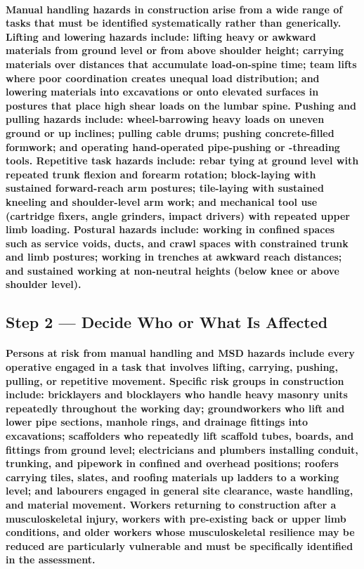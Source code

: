 \paragraph{Manual handling hazards in construction arise from a wide range of tasks that must be identified systematically rather than generically. Lifting and lowering hazards include: lifting heavy or awkward materials from ground level or from above shoulder height; carrying materials over distances that accumulate load-on-spine time; team lifts where poor coordination creates unequal load distribution; and lowering materials into excavations or onto elevated surfaces in postures that place high shear loads on the lumbar spine. Pushing and pulling hazards include: wheel-barrowing heavy loads on uneven ground or up inclines; pulling cable drums; pushing concrete-filled formwork; and operating hand-operated pipe-pushing or -threading tools. Repetitive task hazards include: rebar tying at ground level with repeated trunk flexion and forearm rotation; block-laying with sustained forward-reach arm postures; tile-laying with sustained kneeling and shoulder-level arm work; and mechanical tool use (cartridge fixers, angle grinders, impact drivers) with repeated upper limb loading. Postural hazards include: working in confined spaces such as service voids, ducts, and crawl spaces with constrained trunk and limb postures; working in trenches at awkward reach distances; and sustained working at non-neutral heights (below knee or above shoulder level).}

\subsection{Step 2 --- Decide Who or What Is Affected}
\paragraph{Persons at risk from manual handling and MSD hazards include every operative engaged in a task that involves lifting, carrying, pushing, pulling, or repetitive movement. Specific risk groups in construction include: bricklayers and blocklayers who handle heavy masonry units repeatedly throughout the working day; groundworkers who lift and lower pipe sections, manhole rings, and drainage fittings into excavations; scaffolders who repeatedly lift scaffold tubes, boards, and fittings from ground level; electricians and plumbers installing conduit, trunking, and pipework in confined and overhead positions; roofers carrying tiles, slates, and roofing materials up ladders to a working level; and labourers engaged in general site clearance, waste handling, and material movement. Workers returning to construction after a musculoskeletal injury, workers with pre-existing back or upper limb conditions, and older workers whose musculoskeletal resilience may be reduced are particularly vulnerable and must be specifically identified in the assessment.}

